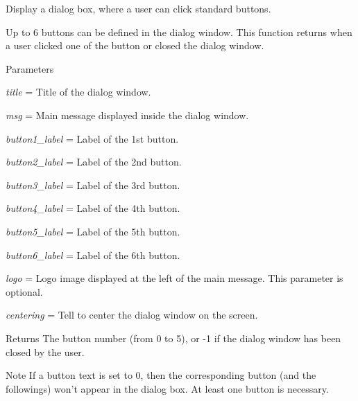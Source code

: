 Display a dialog box, where a user can click standard buttons. 

Up to 6 buttons can be defined in the dialog window. This function returns when a user clicked one of the button or closed the dialog window. 
\begin{DoxyParams}{Parameters}
\item[{\em title}]= Title of the dialog window. \item[{\em msg}]= Main message displayed inside the dialog window. \item[{\em button1\_\-label}]= Label of the 1st button. \item[{\em button2\_\-label}]= Label of the 2nd button. \item[{\em button3\_\-label}]= Label of the 3rd button. \item[{\em button4\_\-label}]= Label of the 4th button. \item[{\em button5\_\-label}]= Label of the 5th button. \item[{\em button6\_\-label}]= Label of the 6th button. \item[{\em logo}]= Logo image displayed at the left of the main message. This parameter is optional. \item[{\em centering}]= Tell to center the dialog window on the screen. \end{DoxyParams}
\begin{DoxyReturn}{Returns}
The button number (from 0 to 5), or -\/1 if the dialog window has been closed by the user. 
\end{DoxyReturn}
\begin{DoxyNote}{Note}
If a button text is set to 0, then the corresponding button (and the followings) won't appear in the dialog box. At least one button is necessary. 
\end{DoxyNote}
